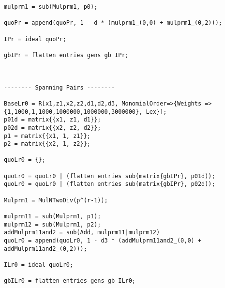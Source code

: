 \begin{lstlisting}
mulprm1 = sub(Mulprm1, p0);

quoPr = append(quoPr, 1 - d * (mulprm1_(0,0) + mulprm1_(0,2)));

IPr = ideal quoPr;

gbIPr = flatten entries gens gb IPr;



-------- Spanning Pairs --------

BaseLr0 = R[x1,z1,x2,z2,d1,d2,d3, MonomialOrder=>{Weights => {1,1000,1,1000,1000000,1000000,3000000}, Lex}];
p01d = matrix{{x1, z1, d1}};
p02d = matrix{{x2, z2, d2}};
p1 = matrix{{x1, 1, z1}};
p2 = matrix{{x2, 1, z2}};

quoLr0 = {};

quoLr0 = quoLr0 | (flatten entries sub(matrix{gbIPr}, p01d));
quoLr0 = quoLr0 | (flatten entries sub(matrix{gbIPr}, p02d));

Mulprm1 = MulNTwoDiv(p^(r-1));

mulprm11 = sub(Mulprm1, p1);
mulprm12 = sub(Mulprm1, p2);
addMulprm11and2 = sub(Add, mulprm11|mulprm12)
quoLr0 = append(quoLr0, 1 - d3 * (addMulprm11and2_(0,0) + addMulprm11and2_(0,2)));

ILr0 = ideal quoLr0;

gbILr0 = flatten entries gens gb ILr0;
\end{lstlisting}
